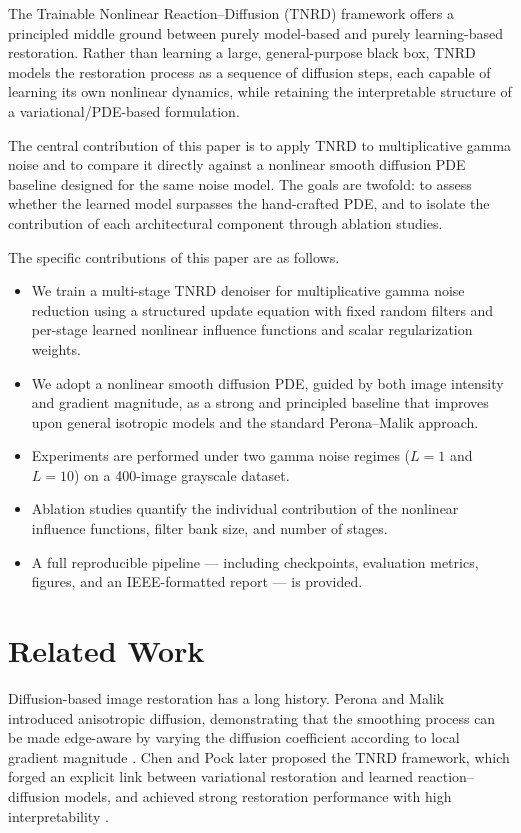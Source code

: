 \documentclass[conference]{IEEEtran}
\begin{document}
The Trainable Nonlinear Reaction--Diffusion (TNRD) framework \cite{chen2017tnrd}
offers a principled middle ground between purely model-based and purely
learning-based restoration. Rather than learning a large, general-purpose black
box, TNRD models the restoration process as a sequence of diffusion steps, each
capable of learning its own nonlinear dynamics, while retaining the interpretable
structure of a variational/PDE-based formulation.

The central contribution of this paper is to apply TNRD to multiplicative gamma
noise and to compare it directly against a nonlinear smooth diffusion PDE baseline
designed for the same noise model. The goals are twofold: to assess whether the
learned model surpasses the hand-crafted PDE, and to isolate the contribution of
each architectural component through ablation studies.

The specific contributions of this paper are as follows.
\begin{itemize}
  \item We train a multi-stage TNRD denoiser for multiplicative gamma noise
        reduction using a structured update equation with fixed random filters and
        per-stage learned nonlinear influence functions and scalar regularization
        weights.
  \item We adopt a nonlinear smooth diffusion PDE, guided by both image intensity
        and gradient magnitude, as a strong and principled baseline that improves
        upon general isotropic models and the standard Perona--Malik approach.
  \item Experiments are performed under two gamma noise regimes ($L=1$ and $L=10$)
        on a 400-image grayscale dataset.
  \item Ablation studies quantify the individual contribution of the nonlinear
        influence functions, filter bank size, and number of stages.
  \item A full reproducible pipeline --- including checkpoints, evaluation metrics,
        figures, and an IEEE-formatted report --- is provided.
\end{itemize}

\section{Related Work}
Diffusion-based image restoration has a long history. Perona and Malik introduced
anisotropic diffusion, demonstrating that the smoothing process can be made
edge-aware by varying the diffusion coefficient according to local gradient
magnitude \cite{perona1990scale}. Chen and Pock later proposed the TNRD framework,
which forged an explicit link between variational restoration and learned
reaction--diffusion models, and achieved strong restoration performance with high
interpretability \cite{chen2017tnrd}.
\end{document}
